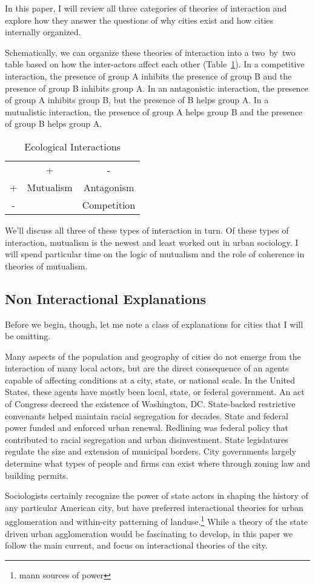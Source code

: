 In this paper, I will review all three categories of theories of
interaction and explore how they answer the questions of why cities
exist and how cities internally organized. 

Schematically, we can organize these theories of interaction into a
two~by~two table based on how the inter-actors affect each other
(Table~\ref{tab:ecological}). In a competitive interaction, the
presence of group A inhibits the presence of group B and the presence
of group B inhibits group A. In an antagonistic interaction, the
presence of group A inhibits group B, but the presence of B helps
group A. In a mutualistic interaction, the presence of
group A helps group B and the presence of group B helps group A.

\begin{table}[h]
\centering
\begin{tabular}{ccc}
  & +          & -           \\
+ & Mutualism  & Antagonism  \\
- &            & Competition  
\end{tabular}
\caption{Ecological Interactions}
\label{tab:ecological}
\end{table}

We'll discuss all three of these types of interaction in turn. Of
these types of interaction, mutualism is the newest and least worked
out in urban sociology. I will spend particular time on the logic of
mutualism and the role of coherence in theories of mutualism.

\subsection*{Non Interactional Explanations}
Before we begin, though, let me note a class of explanations for
cities that I will be omitting.

Many aspects of the population and geography of cities do not emerge
from the interaction of many local actors, but are the direct
consequence of an agents capable of affecting conditions at a city,
state, or national scale. In the United States, these agents have
mostly been local, state, or federal government. An act of Congress
decreed the existence of Washington, DC. State-backed restrictive
convenants helped maintain racial segregation for decades. State and
federal power funded and enforced urban renewal. Redlining was federal
policy that contributed to racial segregation and urban
disinvestment. State legislatures regulate the size and extension of
municipal borders. City governments largely determine what types of
people and firms can exist where through zoning law and building
permits.

Sociologists certainly recognize the power of state actors in shaping
the history of any particular American city, but have preferred
interactional theories for urban agglomeration and within-city
patterning of landuse.\footnote{mann sources of power} While a theory
of the state driven urban agglomeration would be fascinating to
develop, in this paper we follow the main current, and focus on
interactional theories of the city.


